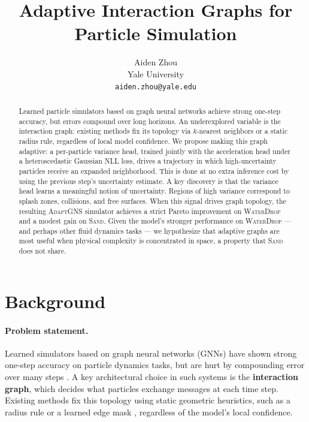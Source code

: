 \documentclass{article}
\title{Adaptive Interaction Graphs for Particle Simulation}
\author{%
  Aiden Zhou \\
  Yale University \\
  \texttt{aiden.zhou@yale.edu}
}
\begin{document}
\maketitle

\begin{abstract}
Learned particle simulators based on graph neural networks achieve strong one-step accuracy, but errors compound over long horizons. An underexplored variable is the interaction graph: existing methods fix its topology via $k$-nearest neighbors or a static radius rule, regardless of local model confidence. We propose making this graph adaptive: a per-particle variance head, trained jointly with the acceleration head under a
heteroscedastic Gaussian NLL loss, drives a trajectory in which high-uncertainty particles receive an expanded neighborhood. This is done at no extra inference cost by using the previous step's uncertainty estimate. A key discovery is that the variance head learns a meaningful notion of uncertainty. Regions of high variance correspond to splash zones, collisions, and free surfaces. When this signal drives graph topology, the resulting \textsc{AdaptGNS} simulator achieves a strict Pareto improvement on \textsc{WaterDrop} and a modest gain on \textsc{Sand}. Given the model's stronger performance on \textsc{WaterDrop} — and perhaps other fluid dynamics tasks — we hypothesize that adaptive graphs are most useful when physical complexity is concentrated in space, a property that \textsc{Sand} does not share.

\end{abstract}



\section{Background} 

\paragraph{Problem statement.}
Learned simulators based on graph neural networks (GNNs) have shown strong one-step accuracy on particle dynamics tasks, but are hurt by compounding error over many steps \cite{gns2020}. A key architectural choice in such systems is the \textbf{interaction graph}, which decides what particles exchange messages at each time step. Existing methods fix this topology using static geometric heuristics, such as a radius rule \cite{gns2020} or a learned edge mask \cite{kipf2018}, regardless of the model's local confidence.
\end{document}
